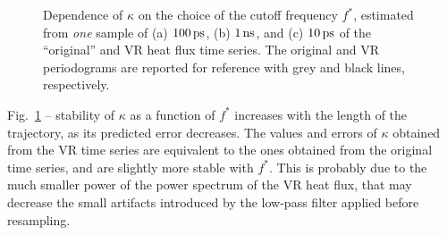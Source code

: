 \begin{figure}[!tb]
    \centering
    \caption{Dependence of $\kappa$ on the choice of the cutoff frequency $f^*$, estimated from \emph{one} sample of (a) $100\,\mathrm{ps}$, (b) $1\,\mathrm{ns}$, and (c) $10\,\mathrm{ps}$ of the ``original'' and VR heat flux time series. 
    The original and VR periodograms are reported for reference with grey and black lines, respectively.}
    \label{fig:csilica-sample-expdens-fstar}
\end{figure}
Fig.~\ref{fig:csilica-sample-expdens-fstar} -- stability of $\kappa$ as a function of $f^*$ increases with the length of the trajectory, as its predicted error decreases. The values and errors of $\kappa$ obtained from the VR time series are equivalent to the ones obtained from the original time series, and are slightly more stable with $f^*$. This is probably due to the much smaller power of the power spectrum of the VR heat flux, that may decrease the small artifacts introduced by the low-pass filter applied before resampling. 

